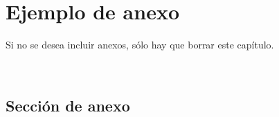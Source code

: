 \chapter{Ejemplo de anexo}\label{sec:ejemploAnexo}
Si no se desea incluir anexos, sólo hay que borrar este capítulo.
\par
\lipsum[1][1-4]\\
\section{Sección de anexo}
\lipsum[1][1-4]\\